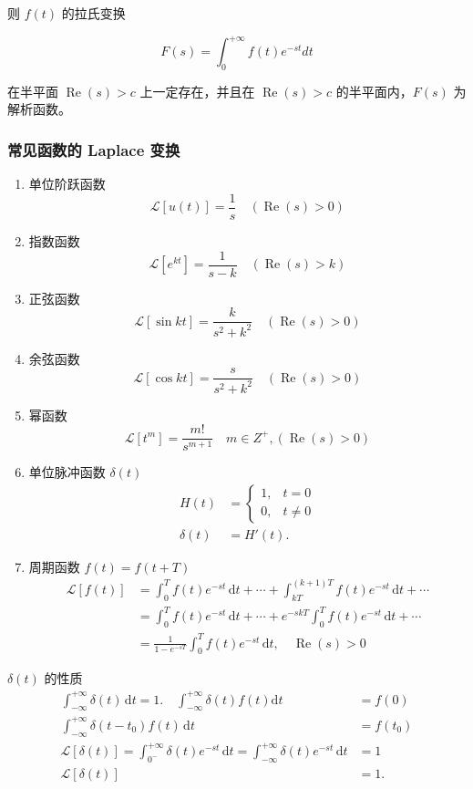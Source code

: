 则 \(f(t)\) 的拉氏变换

\[
F(s)=\int_{0}^{+\infty}f(t)e^{-st}dt
\]

在半平面 \(\operatorname{Re}(s)>c\) 上一定存在，并且在
\(\operatorname{Re}(s)>c\) 的半平面内，\(F(s)\) 为解析函数。
\subsubsection{常见函数的 Laplace 变换}
\label{常见函数的 laplace 变换}
\begin{enumerate}
\item 单位阶跃函数
\[
    \mathcal{L}[u(t)] = \frac{1}{s} \quad (\operatorname{Re}(s) > 0)
    \]
\item 指数函数
\[
    \mathcal{L}[e^{kt}] = \frac{1}{s - k} \quad (\operatorname{Re}(s) > k)
    \]
\item 正弦函数
\[
    \mathcal{L}[\sin kt] = \frac{k}{s^{2} + k^{2}} \quad (\operatorname{Re}(s) > 0)
    \]
\item 余弦函数
\[
    \mathcal{L}[\cos kt] = \frac{s}{s^{2} + k^{2}} \quad (\operatorname{Re}(s) > 0)
    \]
\item 幂函数
\[
    \mathcal{L}[t^{m}] = \frac{m!}{s^{m+1}} \quad m \in Z^{+}, (\operatorname{Re}(s) > 0)
    \]
\item 单位脉冲函数 \(\delta(t)\)
\begin{align*}
 H(t) &= \begin{cases}
     1, & t=0\\
     0, & t \ne 0
 \end{cases} \\
 \delta(t) &= H'(t).
 \end{align*}
\item 周期函数 \(f(t)=f(t+T)\)
\begin{align*}
    \mathcal{L}[f(t)]
    &= \int _0^T f(t)e^{-st}\,\mathrm{d}t + \cdots + \int _{kT}^{(k+1)T} f(t)e^{-st}\,\mathrm{d}t + \cdots
    \\[1ex]
    &= \int _0^T f(t)e^{-st}\,\mathrm{d}t + \cdots + e^{-skT} \int _0^T f(t)e^{-st}\,\mathrm{d}t + \cdots
    \\[1ex]
    &= \boxed{\frac{1}{1-e^{-sT}} \int _0^T f(t)e^{-st}\,\mathrm{d}t,\quad \operatorname{Re}(s) > 0}
\end{align*}
\end{enumerate}

\begin{tcolorbox}[title={Note},colback=red!5!white
,colframe=red!75!black
,colbacktitle=yellow!50!red
,coltitle=red!25!black, fonttitle=\bfseries,subtitle style={boxrule=0.4pt, colback=yellow!50!red!25!white}]
\(\delta(t)\) 的性质
\begin{align*}
\int_{-\infty}^{+\infty} \delta(t) \,\mathrm{d}t = 1. \quad \int _{-\infty}^{+\infty} \delta(t)f(t) \mathrm{d}t &= f(0) \\
\int_{-\infty}^{+\infty} \delta(t-t_0)f(t) \,\mathrm{d}t &= f(t_0) \\
\mathcal{L}[\delta(t)] = \int_{0^{-}}^{+\infty}\delta(t)e^{-st} \,\mathrm{d}t = \int _{-\infty}^{+\infty} \delta(t)e^{-st} \,\mathrm{d}t &= 1 \\
\mathcal{L}[\delta(t)] &= 1.
\end{align*}

\end{tcolorbox}
